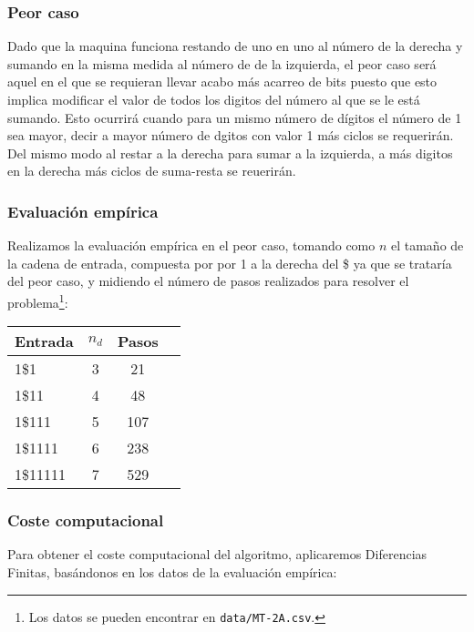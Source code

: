 


\subsubsection*{Peor caso}
Dado que la maquina funciona restando de uno en uno al número de la derecha y sumando en la misma medida al número de de la izquierda, el peor caso será aquel en el que se requieran llevar acabo más acarreo de bits puesto que esto implica modificar el valor de todos los digitos del número al que se le está sumando. Esto ocurrirá cuando para un mismo número de dígitos el número de 1 sea mayor, decir a mayor número de dgitos con valor 1 más ciclos se requerirán.\\
Del mismo modo al restar a la derecha para sumar a la izquierda, a más digitos en la derecha más ciclos de suma-resta se reuerirán.

\subsubsection*{Evaluación empírica}
Realizamos la evaluación empírica en el peor caso, tomando como $n$ el tamaño de la cadena de entrada, compuesta por por 1 a la derecha del \$ ya que se trataría del peor caso, y midiendo el número de pasos realizados para resolver el problema\footnote{Los datos se pueden encontrar en \texttt{data/MT-2A.csv}.}:

\begin{table}[h]
    \centering
    \begin{tabular}{lccc}
        Entrada & $n_d$ & Pasos \\
        \hline
        1\$1                     & 3  & 21   \\
        1\$11                    & 4  & 48   \\
        1\$111                   & 5  & 107  \\
        1\$1111                  & 6  & 238  \\
        1\$11111                 & 7  & 529  \\
    \end{tabular}
\end{table}


\subsubsection*{Coste computacional}
Para obtener el coste computacional del algoritmo, aplicaremos Diferencias Finitas, basándonos en los datos de la evaluación empírica:


